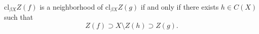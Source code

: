$\mathrm{cl}_{\beta X} Z(f)$ is a neighborhood of $\mathrm{cl}_{\beta X} Z(g)$ if and only if there exists $h \in C(X)$ such that
$$Z(f) \supset X \setminus Z(h) \supset Z(g).$$
